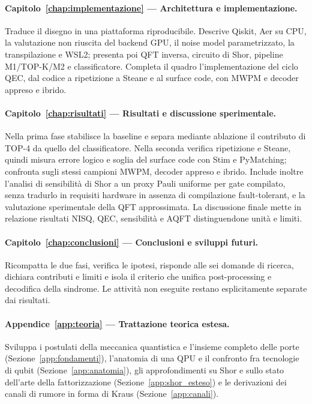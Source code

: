\begin{onehalfspace}
\paragraph{Capitolo~\ref{chap:implementazione} --- Architettura e implementazione.}
Traduce il disegno in una piattaforma riproducibile. Descrive Qiskit, Aer su CPU, la valutazione non riuscita del backend GPU, il noise model parametrizzato, la transpilazione e WSL2; presenta poi QFT inversa, circuito di Shor, pipeline M1/TOP-K/M2 e classificatore. Completa il quadro l'implementazione del ciclo QEC, dal codice a ripetizione a Steane e al surface code, con \ac{MWPM} e decoder appreso e ibrido.

\paragraph{Capitolo~\ref{chap:risultati} --- Risultati e discussione sperimentale.}
Nella prima fase stabilisce la baseline e separa mediante ablazione il contributo di TOP-4 da quello del classificatore. Nella seconda verifica ripetizione e Steane, quindi misura errore logico e soglia del surface code con Stim e PyMatching; confronta sugli stessi campioni \ac{MWPM}, decoder appreso e ibrido. Include inoltre l'analisi di sensibilità di Shor a un proxy Pauli uniforme per gate compilato, senza tradurlo in requisiti hardware in assenza di compilazione fault-tolerant, e la valutazione sperimentale della QFT approssimata. La discussione finale mette in relazione risultati NISQ, QEC, sensibilità e AQFT distinguendone unità e limiti.

\paragraph{Capitolo~\ref{chap:conclusioni} --- Conclusioni e sviluppi futuri.}
Ricompatta le due fasi, verifica le ipotesi, risponde alle sei domande di ricerca, dichiara contributi e limiti e isola il criterio che unifica post-processing e decodifica della sindrome. Le attività non eseguite restano esplicitamente separate dai risultati.

\paragraph{Appendice~\ref{app:teoria} --- Trattazione teorica estesa.}
Sviluppa i postulati della meccanica quantistica e l'insieme completo delle porte (Sezione~\ref{app:fondamenti}), l'anatomia di una \ac{QPU} e il confronto fra tecnologie di qubit (Sezione~\ref{app:anatomia}), gli approfondimenti su Shor e sullo stato dell'arte della fattorizzazione (Sezione~\ref{app:shor_esteso}) e le derivazioni dei canali di rumore in forma di Kraus (Sezione~\ref{app:canali}).


\end{onehalfspace}
